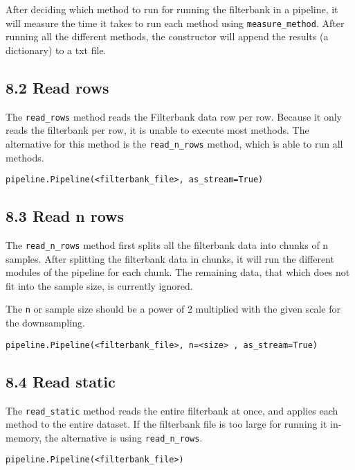 \documentclass[]{article}
\begin{document}
After deciding which method to run for running the filterbank in a
pipeline, it will measure the time it takes to run each method using
\texttt{measure\_method}. After running all the different methods, the
constructor will append the results (a dictionary) to a txt file.

\subsection{8.2 Read rows}\label{read-rows}

The \texttt{read\_rows} method reads the Filterbank data row per row.
Because it only reads the filterbank per row, it is unable to execute
most methods. The alternative for this method is the
\texttt{read\_n\_rows} method, which is able to run all methods.

\begin{verbatim}
pipeline.Pipeline(<filterbank_file>, as_stream=True)
\end{verbatim}

\subsection{8.3 Read n rows}\label{read-n-rows}

The \texttt{read\_n\_rows} method first splits all the filterbank data
into chunks of n samples. After splitting the filterbank data in chunks,
it will run the different modules of the pipeline for each chunk. The
remaining data, that which does not fit into the sample size, is
currently ignored.

The \texttt{n} or sample size should be a power of 2 multiplied with the
given scale for the downsampling.

\begin{verbatim}
pipeline.Pipeline(<filterbank_file>, n=<size> , as_stream=True)
\end{verbatim}

\subsection{8.4 Read static}\label{read-static}

The \texttt{read\_static} method reads the entire filterbank at once,
and applies each method to the entire dataset. If the filterbank file is
too large for running it in-memory, the alternative is using
\texttt{read\_n\_rows}.

\begin{verbatim}
pipeline.Pipeline(<filterbank_file>)
\end{verbatim}
\end{document}
